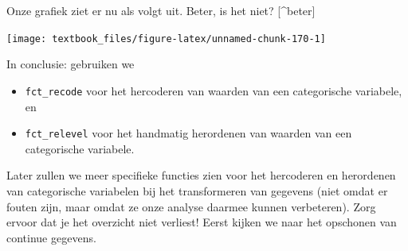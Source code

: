 \documentclass[]{tufte-book}
\newenvironment{Shaded}{}{}
\newcommand{\DataTypeTok}[1]{\textcolor[rgb]{0.56,0.13,0.00}{#1}}
\newcommand{\DecValTok}[1]{\textcolor[rgb]{0.25,0.63,0.44}{#1}}
\newcommand{\KeywordTok}[1]{\textcolor[rgb]{0.00,0.44,0.13}{\textbf{#1}}}
\newcommand{\NormalTok}[1]{#1}
\newcommand{\OperatorTok}[1]{\textcolor[rgb]{0.40,0.40,0.40}{#1}}
\newcommand{\StringTok}[1]{\textcolor[rgb]{0.25,0.44,0.63}{#1}}
\providecommand{\tightlist}{%
  \setlength{\itemsep}{0pt}\setlength{\parskip}{0pt}}
\begin{document}
\begin{Shaded}
\end{Shaded}

Onze grafiek ziet er nu als volgt uit. Beter, is het niet? {[}\^{}beter{]}

\begin{Shaded}
\end{Shaded}

\texttt{[image: textbook\_files/figure-latex/unnamed-chunk-170-1]}

In conclusie: gebruiken we

\begin{itemize}
\tightlist
\item
  \texttt{fct\_recode} voor het hercoderen van waarden van een categorische variabele, en
\item
  \texttt{fct\_relevel} voor het handmatig herordenen van waarden van een categorische variabele.
\end{itemize}

Later zullen we meer specifieke functies zien voor het hercoderen en herordenen van categorische variabelen bij het transformeren van gegevens (niet omdat er fouten zijn, maar omdat ze onze analyse daarmee kunnen verbeteren). Zorg ervoor dat je het overzicht niet verliest! Eerst kijken we naar het opschonen van continue gegevens.
\end{document}
